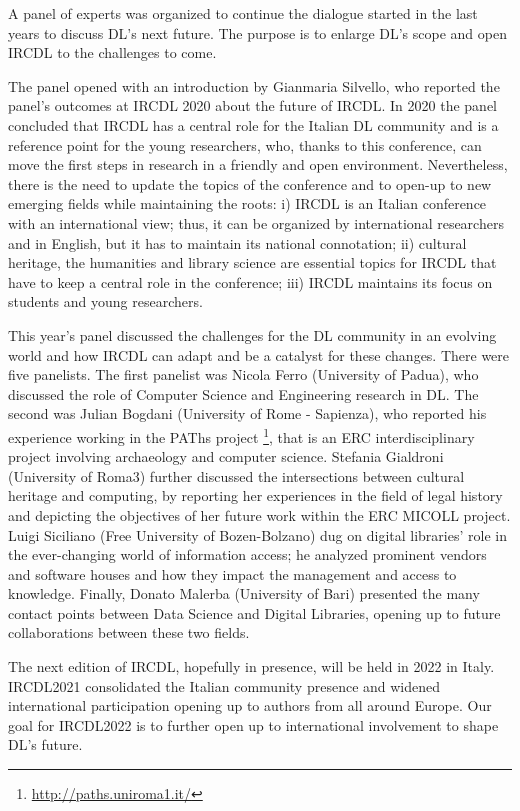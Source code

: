 \documentclass{sig-alternate-10pt}
\begin{document}
A panel of experts was organized to continue the dialogue started in the last years to discuss DL's next future. The purpose is to enlarge DL's scope and open IRCDL to the challenges to come.

The panel opened with an introduction by Gianmaria Silvello, who reported the panel's outcomes at IRCDL 2020 about the future of IRCDL. In 2020 the panel concluded that IRCDL has a central role for the Italian DL community and is a reference point for the young researchers, who, thanks to this conference, can move the first steps in research in a friendly and open environment. Nevertheless, there is the need to update the topics of the conference and to open-up to new emerging fields while maintaining the roots: i) IRCDL is an Italian conference with an international view; thus, it can be organized by international researchers and in English, but it has to maintain its national connotation; ii) cultural heritage, the humanities and library science are essential topics for IRCDL that have to keep a central role in the conference; iii) IRCDL maintains its focus on students and young researchers. 

This year's panel discussed the challenges for the DL community in an evolving world and how IRCDL can adapt and be a catalyst for these changes. There were five panelists. The first panelist was Nicola Ferro (University of Padua), who discussed the role of Computer Science and Engineering research in DL. The second was Julian Bogdani (University of Rome - Sapienza), who reported his experience working in the PAThs project \footnote{\url{http://paths.uniroma1.it/}}, that is an ERC interdisciplinary project involving archaeology and computer science. Stefania Gialdroni (University of Roma3) further discussed the intersections between cultural heritage and computing, by reporting her experiences in the field of legal history and depicting the objectives of her future work within the ERC MICOLL project. Luigi Siciliano (Free University of Bozen-Bolzano) dug on digital libraries' role in the ever-changing world of information access; he analyzed prominent vendors and software houses and how they impact the management and access to knowledge. Finally, Donato Malerba (University of Bari) presented the many contact points between Data Science and Digital Libraries, opening up to future collaborations between these two fields. 

The next edition of IRCDL, hopefully in presence, will be held in 2022 in Italy. IRCDL2021 consolidated the Italian community presence and widened international participation opening up to authors from all around Europe. Our goal for IRCDL2022 is to further open up to international involvement to shape DL's future. 
\end{document}
